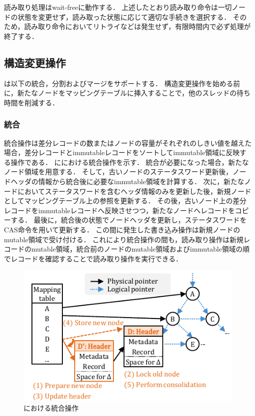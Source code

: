 読み取り処理はwait-freeに動作する．
上述したとおり読み取り命令は一切ノードの状態を変更せず，読み取った状態に応じて適切な手続きを選択する．
そのため，読み取り命令においてリトライなどは発生せず，有限時間内で必ず処理が終了する．

\subsection{構造変更操作}

\Bctree{}は以下の統合，分割およびマージをサポートする．
構造変更操作を始める前に，新たなノードをマッピングテーブルに挿入することで，他のスレッドの待ち時間を削減する．

\subsubsection{統合}

統合操作は差分レコードの数またはノードの容量がそれぞれのしきい値を越えた場合，差分レコードとimmutableレコードをソートしてimmutable領域に反映する操作である．
\Fig{\ref{fig:bc_tree_consolidastion}}に\Bctree{}における統合操作を示す．
統合が必要になった場合，新たなノード領域を用意する．
そして，古いノードのステータスワード更新後，ノードヘッダの情報から統合後に必要なimmutable領域を計算する．
次に，新たなノードにおいてステータスワードを含むヘッダ情報のみを更新した後，新規ノードとしてマッピングテーブル上の参照を更新する．
その後，古いノード上の差分レコードをimmutableレコードへ反映させつつ，新たなノードへレコードをコピーする．
最後に，統合後の状態でノードヘッダを更新し，ステータスワードをCAS命令を用いて更新する．
この間に発生した書き込み操作は新規ノードのmutable領域で受け付ける．
これにより統合操作の間も，読み取り操作は新規レコードのmutable領域，統合前のノードのmutable領域およびimmutable領域の順でレコードを確認することで読み取り操作を実行できる．

\begin{figure}[t]
    \centering
    \includegraphics{./figures/Bc-consolidate.pdf}
    \caption{\Bctree{}における統合操作}
    \label{fig:bc_tree_consolidastion}
\end{figure}

